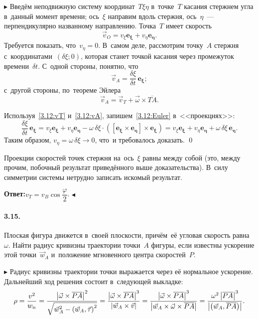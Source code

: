 \documentclass{weekly}
\begin{document}
$\blacktriangleright$ Введём неподвижную систему координат~$T\xi\eta$
в~точке~$T$ касания стержнем угла в~данный момент времени;
ось~$\xi$ направим вдоль стержня,
ось~$\eta$~--- перпендикулярно названному направлению.
Точка~$T$ имеет скорость
\begin{equation}\label{3.12:vT}
    \vec v_O = v_\xi \mathbf{e_\xi} + v_\eta \mathbf{e_\eta}.
\end{equation}
Требуется показать, что~$v_\eta = 0$. В~самом деле, рассмотрим
точку~$A$ стержня с~координатами~$(\delta \xi; 0)$,
которая станет точкой касания через промежуток времени~$\delta t$.
С~одной стороны, понятно, что
\begin{equation}\label{3.12:vA}
    \vec v_A = \frac{\delta \xi}{\delta t} \,\mathbf{e_\xi};
\end{equation}
с~другой стороны, по~теореме Эйлера
\begin{equation}\label{3.12:Euler}
    \vec v_A = \vec v_T + \vec\omega \times \overline{TA}.
\end{equation}

Используя~\eqref{3.12:vT} и~\eqref{3.12:vA}, запишем~\eqref{3.12:Euler}
в~<<проекциях>>:
\begin{equation}
    \frac{\delta\xi}{\delta t} \,\mathbf{e_\xi}
        = v_\xi \mathbf{e_\xi} + v_\eta \mathbf{e_\eta} -
            \omega\,\delta\xi \cdot
            \left(\mathbf{[e_\xi \times e_\eta] \times
                \mathbf{e_\xi}}\right)
        = v_\xi \mathbf{e_\xi} + v_\eta \mathbf{e_\eta} +
            \omega\,\delta\xi \,\mathbf{e_\eta}.
\end{equation}
Таким образом, $v_\eta = \omega \,\delta\xi \to 0$,
что~и требовалось доказать. \qed

Проекции скоростей точек стержня
на~ось~$\xi$ равны между собой (это, между прочим, побочный результат
приведённого выше доказательства). В~силу симметрии системы
нетрудно записать искомый результат.

\textbf{Ответ:}\quad $v_T = v_B \cos\dfrac{\varphi}{2}$.
\hfill $\blacktriangleleft$


\paragraph{3.15.} Плоская фигура движется в~своей плоскости,
причём~её угловая скорость равна~$\omega$. Найти радиус кривизны
траектории точки~$A$ фигуры, если известны ускорение
этой точки~$\vec w_A$ и~положение мгновенного центра скоростей~$P$.

$\blacktriangleright$ Радиус кривизны траектории точки выражается
через её нормальное ускорение. Дальнейший ход решения
состоит в~следующей выкладке:
\begin{equation}
    \rho = \frac{v^2}{w_n}
        = \frac{\left| \vec\omega \times \overline{PA} \right|^2}
            {\sqrt{\vec w_A^2 - \left(\vec w_A, \vec\tau\right)^2}}
        = \frac{\left| \vec\omega \times \overline{PA} \right|^3}
            {\left| \vec w_A \times \vec v \right|}
        = \frac{\left| \vec\omega \times \overline{PA} \right|^3}
            {\left| \vec w_A \times \vec\omega \times \overline{PA} \right|}
        = \frac{\omega^2 \left| \overline{PA} \right|^3}
            {\left| \left(\vec w_A, \overline{PA}\right) \right|}.
\end{equation}
\end{document}
